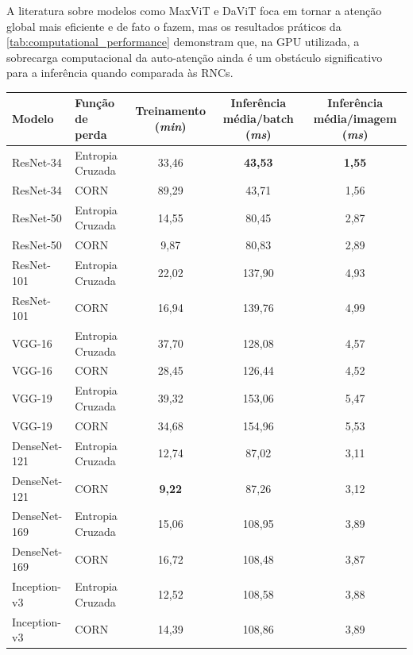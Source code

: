 A literatura sobre modelos como MaxViT e DaViT foca em tornar a atenção global mais eficiente e de fato o fazem, mas os resultados práticos da \autoref{tab:computational_performance} demonstram que, na GPU utilizada, a sobrecarga computacional da auto-atenção ainda é um obstáculo significativo para a inferência quando comparada às RNCs.

\begin{table}
    \centering
    \begin{tabular}{|l|l|c|c|c|}
        \hline
        \textbf{Modelo} & \textbf{Função de perda} & \textbf{Treinamento (\textit{min})} & \textbf{Inferência média/batch (\textit{ms})} & \textbf{Inferência média/imagem (\textit{ms})} \\
        \hline
        ResNet-34 & Entropia Cruzada & 33,46 & \textbf{43,53} & \textbf{1,55} \\
        \hline
        ResNet-34 & CORN & 89,29 & 43,71 & 1,56 \\
        \hline
        ResNet-50 & Entropia Cruzada & 14,55 & 80,45 & 2,87 \\
        \hline
        ResNet-50 & CORN & 9,87 & 80,83 & 2,89 \\
        \hline
        ResNet-101 & Entropia Cruzada & 22,02 & 137,90 & 4,93 \\
        \hline
        ResNet-101 & CORN & 16,94 & 139,76 & 4,99 \\
        \hline
        VGG-16 & Entropia Cruzada & 37,70 & 128,08 & 4,57 \\
        \hline
        VGG-16 & CORN & 28,45 & 126,44 & 4,52 \\
        \hline
        VGG-19 & Entropia Cruzada & 39,32 & 153,06 & 5,47 \\
        \hline
        VGG-19 & CORN & 34,68 & 154,96 & 5,53 \\
        \hline
        DenseNet-121 & Entropia Cruzada & 12,74 & 87,02 & 3,11 \\
        \hline
        DenseNet-121 & CORN & \textbf{9,22} & 87,26 & 3,12 \\
        \hline
        DenseNet-169 & Entropia Cruzada & 15,06 & 108,95 & 3,89 \\
        \hline
        DenseNet-169 & CORN & 16,72 & 108,48 & 3,87 \\
        \hline
        Inception-v3 & Entropia Cruzada & 12,52 & 108,58 & 3,88 \\
        \hline
        Inception-v3 & CORN & 14,39 & 108,86 & 3,89 \\

\end{tabular}
\end{table}
